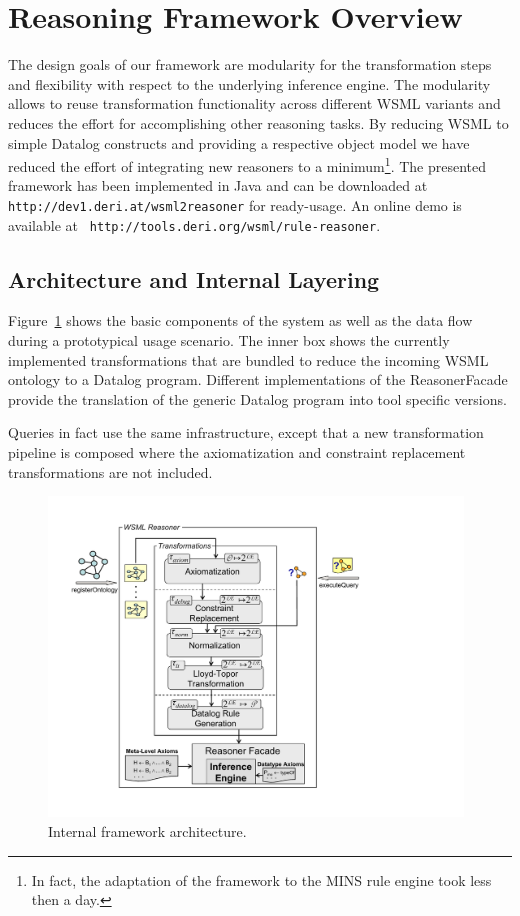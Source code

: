 \section{Reasoning Framework Overview\label{sec:framework}}

The design goals of our framework are modularity for the
transformation steps and flexibility with respect to the
underlying inference engine. The modularity allows to reuse
transformation functionality across different WSML variants and
reduces the effort for accomplishing other reasoning tasks. By
reducing WSML to simple Datalog constructs and providing a
respective object model we have reduced the effort of integrating
new reasoners to a minimum\footnote{In fact, the adaptation of the
framework to the MINS rule engine took less then a day.}. The
presented framework has been implemented in Java and can be
downloaded at {\tt http://dev1.deri.at/wsml2reasoner} for
ready-usage. An online demo is available at {\tt
http://tools.deri.org/wsml/rule-reasoner}.


\subsection{Architecture and Internal Layering}
Figure~\ref{fig:layering} shows the basic components of the system
 as well as the
data flow during a prototypical usage scenario. The inner box
shows the currently implemented transformations that are bundled
to reduce the incoming WSML ontology to a Datalog program.
Different implementations of the ReasonerFacade provide the
translation of the generic Datalog program into tool specific
versions.

Queries in fact use the same infrastructure, except that a new transformation pipeline is
composed where the axiomatization and constraint replacement transformations are not included.

%

\begin{figure}[h]
    \includegraphics[width=11cm]{figures/layering}
    \centering
    \caption{Internal framework architecture. \label{fig:layering}}
\end{figure}


